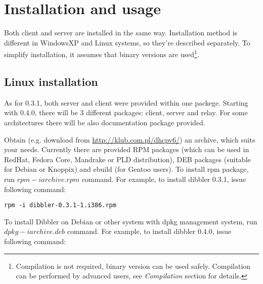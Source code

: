 
\section{Installation and usage}
Both client and server are installed in the same way. Installation
method is different in WindowsXP and Linux systems, so they're described
separately. To simplify installation, it assumes that binary versions
are used\footnote{Compilation is not
  required, binary version can be used safely. Compilation can be performed by
  advanced users, see \emph{Compilation} section for details.}.

\subsection{Linux installation}
As for 0.3.1, both server and client were provided within one
packege. Starting with 0.4.0, there will be 3 different packages:
client, server and relay. For some architectures there will be also
documentation package provided.

Obtain (e.g. download from \url{http://klub.com.pl/dhcpv6/}) an
archive, which suits your needs. Currently there are provided RPM packages
(which can be used in RedHat, Fedora Core, Mandrake or PLD
distribution), DEB packages (suitable for Debian or Knoppix) and
ebuild (for Gentoo users). To install rpm package, run $rpm -i
archive.rpm$ command. For example, to install dibbler 0.3.1, issue following command:
\begin{verbatim}
rpm -i dibbler-0.3.1-1.i386.rpm 
\end{verbatim}

To install Dibbler on Debian or other system with dpkg management
system, run $dpkg -i archive.deb$ command. For example, to install
dibbler 0.4.0, issue following command:

